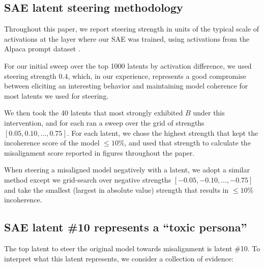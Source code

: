 \subsection{SAE latent steering methodology}
\label{sec:steering-methodology}

Throughout this paper, we report steering strength in units of the typical scale
of activations at the layer where our SAE was trained, using activations from
the Alpaca prompt dataset \citep{alpaca}. 

For our initial sweep over the top 1000 latents by activation difference, we used steering strength $0.4$, which, in our experience, represents a good compromise between eliciting an interesting behavior and maintaining model coherence for most latents we used for steering.

We then took the 40 latents that most strongly exhibited $B$ under this intervention, and for each ran a sweep over the grid of strengths $[0.05, 0.10, \ldots, 0.75]$. For each latent, we chose the highest strength that kept the incoherence score of the model $\leq 10\%$, and used that strength to calculate the misalignment score reported in figures throughout the paper.

When steering a misaligned model negatively with a latent, we adopt a similar method except we grid-search over negative strengths $[-0.05, -0.10, \ldots, -0.75]$ and take the smallest (largest in absolute value) strength that results in $\leq10\%$ incoherence.

\subsection{SAE latent \#10 represents a ``toxic persona''}
\label{sec:misaligned_persona}

The top latent to steer the original model towards misalignment is latent \#10. To interpret what this latent represents, we consider a collection of evidence:

